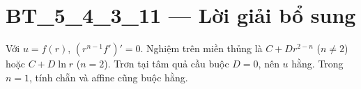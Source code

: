 \documentclass[10pt,a4paper]{article}
\begin{document}
\section*{BT\_5\_4\_3\_11 — Lời giải bổ sung}
Với $u=f(r)$, $(r^{n-1}f')'=0$. Nghiệm trên miền thủng là $C+Dr^{2-n}$ ($n\ne2$) hoặc $C+D\ln r$ ($n=2$). Trơn tại tâm quả cầu buộc $D=0$, nên $u$ hằng. Trong $n=1$, tính chẵn và affine cũng buộc hằng.
\end{document}
